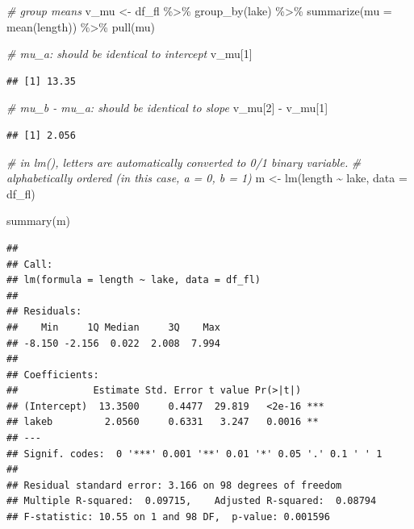 \documentclass[
]{book}
\newenvironment{Shaded}{\begin{snugshade}}{\end{snugshade}}
\newcommand{\AttributeTok}[1]{\textcolor[rgb]{0.77,0.63,0.00}{#1}}
\newcommand{\CommentTok}[1]{\textcolor[rgb]{0.56,0.35,0.01}{\textit{#1}}}
\newcommand{\DecValTok}[1]{\textcolor[rgb]{0.00,0.00,0.81}{#1}}
\newcommand{\FunctionTok}[1]{\textcolor[rgb]{0.00,0.00,0.00}{#1}}
\newcommand{\NormalTok}[1]{#1}
\newcommand{\OtherTok}[1]{\textcolor[rgb]{0.56,0.35,0.01}{#1}}
\newcommand{\SpecialCharTok}[1]{\textcolor[rgb]{0.00,0.00,0.00}{#1}}
\begin{document}
\begin{Shaded}
\begin{Highlighting}[]
\CommentTok{\# group means}
\NormalTok{v\_mu }\OtherTok{\textless{}{-}}\NormalTok{ df\_fl }\SpecialCharTok{\%\textgreater{}\%} 
  \FunctionTok{group\_by}\NormalTok{(lake) }\SpecialCharTok{\%\textgreater{}\%} 
  \FunctionTok{summarize}\NormalTok{(}\AttributeTok{mu =} \FunctionTok{mean}\NormalTok{(length)) }\SpecialCharTok{\%\textgreater{}\%} 
  \FunctionTok{pull}\NormalTok{(mu)}

\CommentTok{\# mu\_a: should be identical to intercept}
\NormalTok{v\_mu[}\DecValTok{1}\NormalTok{]}
\end{Highlighting}
\end{Shaded}

\begin{verbatim}
## [1] 13.35
\end{verbatim}

\begin{Shaded}
\begin{Highlighting}[]
\CommentTok{\# mu\_b {-} mu\_a: should be identical to slope}
\NormalTok{v\_mu[}\DecValTok{2}\NormalTok{] }\SpecialCharTok{{-}}\NormalTok{ v\_mu[}\DecValTok{1}\NormalTok{]}
\end{Highlighting}
\end{Shaded}

\begin{verbatim}
## [1] 2.056
\end{verbatim}

\begin{Shaded}
\begin{Highlighting}[]
\CommentTok{\# in lm(), letters are automatically converted to 0/1 binary variable.}
\CommentTok{\# alphabetically ordered (in this case, a = 0, b = 1)}
\NormalTok{m }\OtherTok{\textless{}{-}} \FunctionTok{lm}\NormalTok{(length }\SpecialCharTok{\textasciitilde{}}\NormalTok{ lake,}
        \AttributeTok{data =}\NormalTok{ df\_fl)}

\FunctionTok{summary}\NormalTok{(m)}
\end{Highlighting}
\end{Shaded}

\begin{verbatim}
## 
## Call:
## lm(formula = length ~ lake, data = df_fl)
## 
## Residuals:
##    Min     1Q Median     3Q    Max 
## -8.150 -2.156  0.022  2.008  7.994 
## 
## Coefficients:
##             Estimate Std. Error t value Pr(>|t|)    
## (Intercept)  13.3500     0.4477  29.819   <2e-16 ***
## lakeb         2.0560     0.6331   3.247   0.0016 ** 
## ---
## Signif. codes:  0 '***' 0.001 '**' 0.01 '*' 0.05 '.' 0.1 ' ' 1
## 
## Residual standard error: 3.166 on 98 degrees of freedom
## Multiple R-squared:  0.09715,    Adjusted R-squared:  0.08794 
## F-statistic: 10.55 on 1 and 98 DF,  p-value: 0.001596
\end{verbatim}
\end{document}

